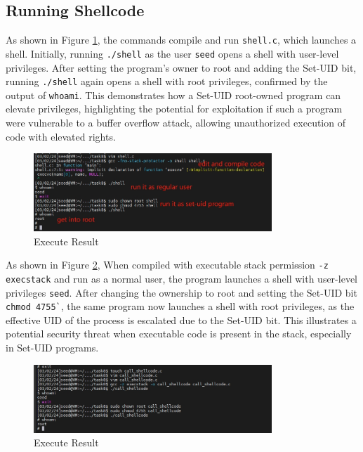 \documentclass[a4paper,11pt]{article}
\begin{document}
\subsection{Running Shellcode}

As shown in Figure \ref{fig:task8.1}, the commands compile and run \verb|shell.c|, which launches a shell. Initially, running \verb|./shell| as the user \verb|seed| opens a shell with user-level privileges. After setting the program's owner to root and adding the Set-UID bit, running \verb|./shell| again opens a shell with root privileges, confirmed by the output of \verb|whoami|. This demonstrates how a Set-UID root-owned program can elevate privileges, highlighting the potential for exploitation if such a program were vulnerable to a buffer overflow attack, allowing unauthorized execution of code with elevated rights.

\begin{figure}[h]
    \centering
       \includegraphics[width=0.8\textwidth]{figures/task8/task8.1.png}
    \caption{Execute Result}\label{fig:task8.1}
\end{figure}

As shown in Figure \ref{fig:task8.2}, When compiled with executable stack permission \verb|-z execstack| and run as a normal user, the program launches a shell with user-level privileges \verb|seed|. After changing the ownership to root and setting the Set-UID bit \verb|chmod 4755`|, the same program now launches a shell with root privileges, as the effective UID of the process is escalated due to the Set-UID bit. This illustrates a potential security threat when executable code is present in the stack, especially in Set-UID programs.
\begin{figure}[h]
    \centering
       \includegraphics[width=0.8\textwidth]{figures/task8/task8.2.png}
    \caption{Execute Result}\label{fig:task8.2}
\end{figure}
\end{document}
